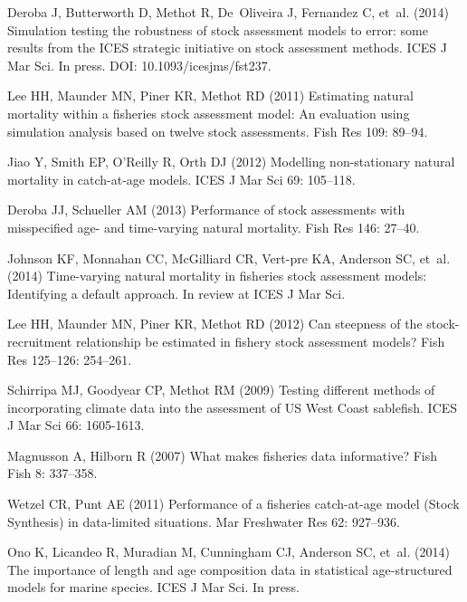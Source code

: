 \begin{thebibliography}{10}
Deroba J, Butterworth D, Methot R, De~Oliveira J, Fernandez C, et~al. (2014)
  Simulation testing the robustness of stock assessment models to error: some
  results from the {ICES} strategic initiative on stock assessment methods.
\newblock ICES J Mar Sci. In press. DOI: 10.1093/icesjms/fst237.

Lee HH, Maunder MN, Piner KR, Methot RD (2011) Estimating natural mortality
  within a fisheries stock assessment model: An evaluation using simulation
  analysis based on twelve stock assessments.
\newblock Fish Res 109: 89--94.

Jiao Y, Smith EP, O'Reilly R, Orth DJ (2012) Modelling non-stationary natural
  mortality in catch-at-age models.
\newblock ICES J Mar Sci 69: 105--118.

Deroba JJ, Schueller AM (2013) Performance of stock assessments with
  misspecified age- and time-varying natural mortality.
\newblock Fish Res 146: 27--40.

Johnson KF, Monnahan CC, McGilliard CR, Vert-pre KA, Anderson SC, et~al. (2014)
  Time-varying natural mortality in fisheries stock assessment models:
  Identifying a default approach.
\newblock In review at ICES J Mar Sci.

Lee HH, Maunder MN, Piner KR, Methot RD (2012) Can steepness of the
  stock-recruitment relationship be estimated in fishery stock assessment
  models?
\newblock Fish Res 125--126: 254--261.

Schirripa MJ, Goodyear CP, Methot RM (2009) Testing different methods of
  incorporating climate data into the assessment of {US West Coast} sablefish.
\newblock ICES J Mar Sci 66: 1605-1613.

Magnusson A, Hilborn R (2007) What makes fisheries data informative?
\newblock Fish Fish 8: 337--358.

Wetzel CR, Punt AE (2011) Performance of a fisheries catch-at-age model ({Stock
  Synthesis}) in data-limited situations.
\newblock Mar Freshwater Res 62: 927--936.

Ono K, Licandeo R, Muradian M, Cunningham CJ, Anderson SC, et~al. (2014) The
  importance of length and age composition data in statistical age-structured
  models for marine species.
\newblock ICES J Mar Sci. In press.


\end{thebibliography}
